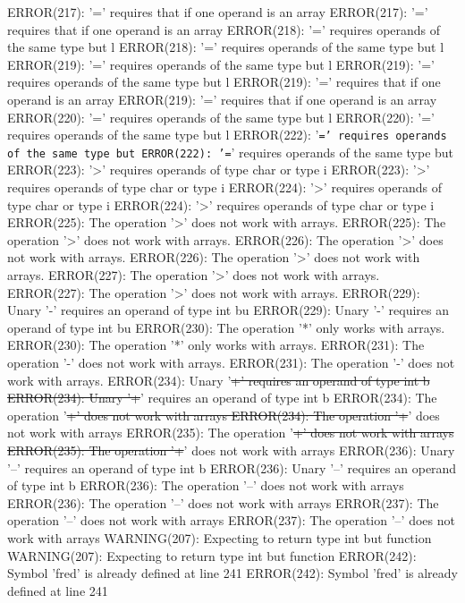 \documentclass[12pt]{book}
\begin{document}
ERROR(217): '=' requires that if one operand is an array        ERROR(217): '=' requires that if one operand is an array
ERROR(218): '=' requires operands of the same type but l        ERROR(218): '=' requires operands of the same type but l
ERROR(219): '=' requires operands of the same type but l        ERROR(219): '=' requires operands of the same type but l
ERROR(219): '=' requires that if one operand is an array        ERROR(219): '=' requires that if one operand is an array
ERROR(220): '=' requires operands of the same type but l        ERROR(220): '=' requires operands of the same type but l
ERROR(222): '\texttt{=' requires operands of the same type but 	ERROR(222): '=}' requires operands of the same type but 
ERROR(223): '>' requires operands of type char or type i        ERROR(223): '>' requires operands of type char or type i
ERROR(224): '>' requires operands of type char or type i        ERROR(224): '>' requires operands of type char or type i
ERROR(225): The operation '>' does not work with arrays.        ERROR(225): The operation '>' does not work with arrays.
ERROR(226): The operation '>' does not work with arrays.        ERROR(226): The operation '>' does not work with arrays.
ERROR(227): The operation '>' does not work with arrays.        ERROR(227): The operation '>' does not work with arrays.
ERROR(229): Unary '-' requires an operand of type int bu        ERROR(229): Unary '-' requires an operand of type int bu
ERROR(230): The operation '*' only works with arrays.                ERROR(230): The operation '*' only works with arrays.
ERROR(231): The operation '-' does not work with arrays.        ERROR(231): The operation '-' does not work with arrays.
ERROR(234): Unary '\sout{+' requires an operand of type int b        ERROR(234): Unary '+}' requires an operand of type int b
ERROR(234): The operation '\sout{+' does not work with arrays        ERROR(234): The operation '+}' does not work with arrays
ERROR(235): The operation '\sout{+' does not work with arrays        ERROR(235): The operation '+}' does not work with arrays
ERROR(236): Unary '--' requires an operand of type int b        ERROR(236): Unary '--' requires an operand of type int b
ERROR(236): The operation '--' does not work with arrays        ERROR(236): The operation '--' does not work with arrays
ERROR(237): The operation '--' does not work with arrays        ERROR(237): The operation '--' does not work with arrays
WARNING(207): Expecting to return type int but function         WARNING(207): Expecting to return type int but function 
ERROR(242): Symbol 'fred' is already defined at line 241        ERROR(242): Symbol 'fred' is already defined at line 241
\end{document}
